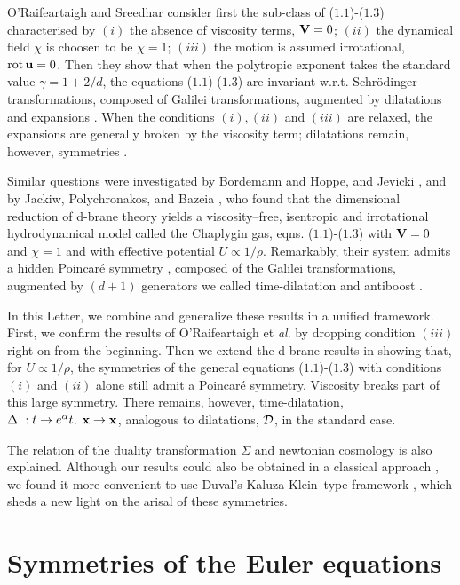 \documentclass[11pt,a4paper]{article}
\let\ssection=\section
\renewcommand{\section}{\setcounter{equation}{0}\ssection}
\def\D{{\cal D}}
\begin{document}
O'Raifeartaigh and Sreedhar consider first the sub-class of
($1.1$)-($1.3$) characterised
by
$(i)$ the absence of viscosity terms, ${\bf V}=0$;
$(ii)$ the dynamical field $\chi$ is choosen to be
$\chi=1$;
$(iii)$ the motion is assumed irrotational,
${\rm rot}\,{\bf u}=0$.
Then they show that
when the polytropic exponent takes the standard value $\gamma=1+2/d$,
the equations
($1.1$)-($1.3$) are invariant w.r.t. Schr\"{o}dinger
transformations, composed of Galilei transformations, augmented by
dilatations and expansions
\cite{NH}. When the conditions $(i), (ii)$ and $(iii)$ are relaxed,
the expansions are generally broken by the viscosity term;
dilatations remain, however, symmetries \cite{RS}.

Similar questions were
investigated by Bordemann and Hoppe, and Jevicki \cite{BoHo},
and by Jackiw, Polychronakos, and Bazeia
\cite{JAC, BJ}, who found that the dimensional reduction
of d-brane theory yields a
viscosity--free, isentropic and irrotational hydrodynamical model
called the Chaplygin gas,
eqns. ($1.1$)-($1.3$) with ${\bf V}=0$ and $\chi=1$ and
with effective
potential $U \propto 1/\rho$.
Remarkably, their system
admits a hidden Poincar\'e symmetry \cite{BoHo, JAC, BJ},
composed of the Galilei transformations,
augmented by $(d+1)$ generators we called time-dilatation and antiboost
 \cite{HH}.

\goodbreak
In this Letter, we combine and generalize these results in a unified
framework.
First, we confirm  the results of O'Raifeartaigh
et {\it al}. by dropping condition $(iii)$ right on from the
beginning.
Then we extend the d-brane results in \cite{BoHo, JAC, BJ}
showing that, for $U \propto 1/\rho$, the symmetries of
the general equations ($1.1$)-($1.3$) with conditions $(i)$ and $(ii)$ alone
 still admit a Poincar\'e symmetry.
Viscosity breaks part of this large symmetry.
There remains, however,  time-dilatation,
$\Delta~: t\to e^{\alpha}t,\; {\bf x}\to {\bf x}$, analogous to
dilatations, $\D$,  in the standard case.
\goodbreak

 The relation of the duality transformation
$\Sigma$ and newtonian cosmology is also explained.
Although our results could also be obtained in a classical
approach \cite{NH,  RS, BJ},
we found it more convenient to use  Duval's Kaluza
Klein--type framework \cite{DGH}, which sheds a new light
on the arisal of these symmetries.

\section{Symmetries of the Euler equations}
\end{document}
